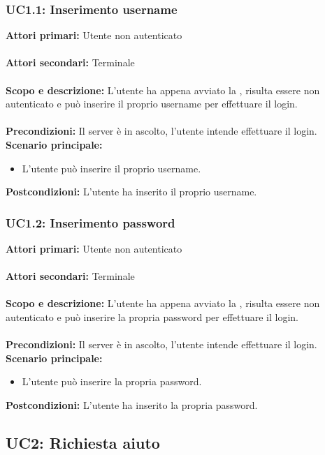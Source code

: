 \documentclass{scalatekids-article}
\begin{document}
\subsubsection{UC1.1: Inserimento username}

\textbf{Attori primari:} Utente non autenticato\\ \\
\textbf{Attori secondari:} Terminale\\ \\
\textbf{Scopo e descrizione:}
L'utente ha appena avviato la , risulta essere non autenticato e può inserire il proprio username per effettuare il login.\\ \\
\textbf{Precondizioni:} Il server è in ascolto, l'utente intende effettuare il login.
\textbf{Scenario principale:}
\begin{itemize}
\item L'utente può inserire il proprio username.
\end{itemize}
\textbf{Postcondizioni:} L'utente ha inserito il proprio username.

\subsubsection{UC1.2: Inserimento password}

\textbf{Attori primari:} Utente non autenticato\\ \\
\textbf{Attori secondari:} Terminale\\ \\
\textbf{Scopo e descrizione:}
L'utente ha appena avviato la , risulta essere non autenticato e può inserire la propria password per effettuare il login.\\ \\
\textbf{Precondizioni:} Il server è in ascolto, l'utente intende effettuare il login.
\textbf{Scenario principale:}
\begin{itemize}
\item L'utente può inserire la propria password.
\end{itemize}
\textbf{Postcondizioni:} L'utente ha inserito la propria password.

\subsection{UC2: Richiesta aiuto}
\end{document}
